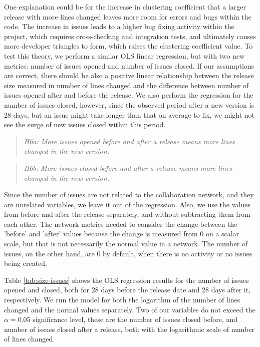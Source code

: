 One explanation could be for the increase in clustering coefficient that a larger release with more lines changed leaves more room for errors and bugs within the code. The increase in issues leads to a higher bug fixing activity within the project, which requires cross-checking and integration tests, and ultimately causes more developer triangles to form, which raises the clustering coefficient value. To test this theory, we perform a similar OLS linear regression, but with two new metrics: number of issues opened and number of issues closed. If our assumptions are correct, there should be also a positive linear relationship between the release size measured in number of lines changed and the difference between number of issues opened after and before the release. We also perform the regression for the number of issues closed, however, since the observed period after a new version is 28 days, but an issue might take longer than that on average to fix, we might not see the surge of new issues closed within this period.

\begin{quote}
    \textit{H6a: More issues opened before and after a release means more lines changed in the new version.}
\end{quote}

\begin{quote}
    \textit{H6b: More issues closed before and after a release means more lines changed in the new version.}
\end{quote}

Since the number of issues are not related to the collaboration network, and they are unrelated variables, we leave it out of the regression. Also, we use the values from before and after the release separately, and without subtracting them from each other. The network metrics needed to consider the change between the 'before' and 'after' values because the change is measured from 0 on a scalar scale, but that is not necessarily the normal value in a network. The number of issues, on the other hand, are 0 by default, when there is no activity or no issues being created.

Table \ref{tab:size-issues} shows the OLS regression results for the number of issues opened and closed, both for 28 days before the release date and 28 days after it, respectively. We run the model for both the logarithm of the number of lines changed and the normal values separately. Two of our variables do not exceed the $\alpha = 0.05$ significance level, these are the number of issues closed before, and number of issues closed after a release, both with the logarithmic scale of number of lines changed.

